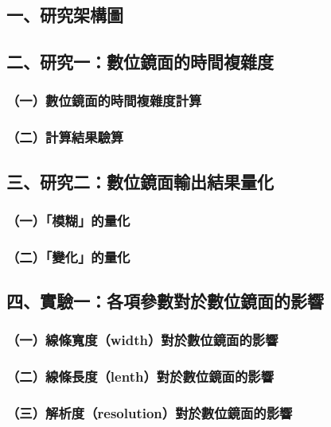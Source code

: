 \documentclass[12pt]{article}
\begin{document}
\subsection{一、研究架構圖}

\subsection{二、研究一：數位鏡面的時間複雜度}

\subsubsection{（一）數位鏡面的時間複雜度計算}

\subsubsection{（二）計算結果驗算}

\subsection{三、研究二：數位鏡面輸出結果量化}

\subsubsection{（一）「模糊」的量化}

\subsubsection{（二）「變化」的量化}

\subsection{四、實驗一：各項參數對於數位鏡面的影響}

\subsubsection{（一）線條寬度（width）對於數位鏡面的影響}

\subsubsection{（二）線條長度（lenth）對於數位鏡面的影響}

\subsubsection{（三）解析度（resolution）對於數位鏡面的影響}
\end{document}
